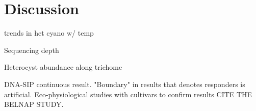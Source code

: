 \section{Discussion}

\cite{Yeager_2012} trends in het cyano w/ temp

Sequencing depth

Heterocyst abundance along trichome

DNA-SIP continuous result. "Boundary" in results that denotes responders is artificial. Eco-physiological studies with cultivars to confirm results CITE THE BELNAP STUDY.

